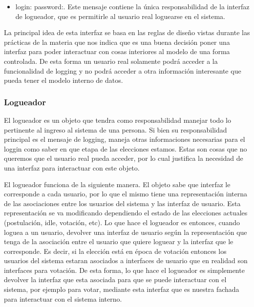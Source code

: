 \begin{itemize}
\item login: password:. Este mensaje contiene la \'unica responsabilidad de la interfaz de logueador, que es permitirle al usuario real loguearse en el sistema.
\end{itemize}

La principal idea de esta interfaz se basa en las reglas de diseño vistas durante las pr\'acticas de la materia que nos indica que es una buena decisi\'on poner una interfaz para poder interactuar con cosas interiores al modelo de una forma controlada. De esta forma un usuario real solamente podr\'a acceder a la funcionalidad de logging y no podr\'a acceder a otra informaci\'on interesante que pueda tener el modelo interno de datos. 

\subsubsection{Logueador}

El logueador es un objeto que tendra como responsabilidad manejar todo lo pertinente al ingreso al sistema de una persona. Si bien su responsabilidad principal es el mensaje de logging, maneja otras informaciones necesarias para el loggin como saber en que etapa de las elecciones estamos. Estas son cosas que no queremos que el usuario real pueda acceder, por lo cual justifica la necesidad de una interfaz para interactuar con este objeto.

El logueador funciona de la siguiente manera. El objeto sabe que interfaz le corresponde a cada usuario, por lo que el mismo tiene una representaci\'on interna de las asociaciones entre los usuarios del sistema y las interfaz de usuario. Esta representaci\'on se va modificando dependiendo el estado de las elecciones actuales (postulaci\'on, idle, votaci\'on, etc).
Lo que hace el logueador es entonces, cuando loguea a un usuario, devolver una interfaz de usuario seg\'un la representaci\'on que tenga de la asociaci\'on entre el usuario que quiere loguear y la interfaz que le corresponde. Es decir, si la elecci\'on est\'a en \'epoca de votaci\'on entonces los usuarios del sistema estaran asociados a interfaces de usuario que en realidad son interfaces para votaci\'on. De esta forma, lo que hace el logueador es simplemente devolver la interfaz que esta asociada para que se puede interactuar con el sistema, por ejemplo para votar, mediante esta interfaz que es nuestra fachada para interactuar con el sistema interno.

